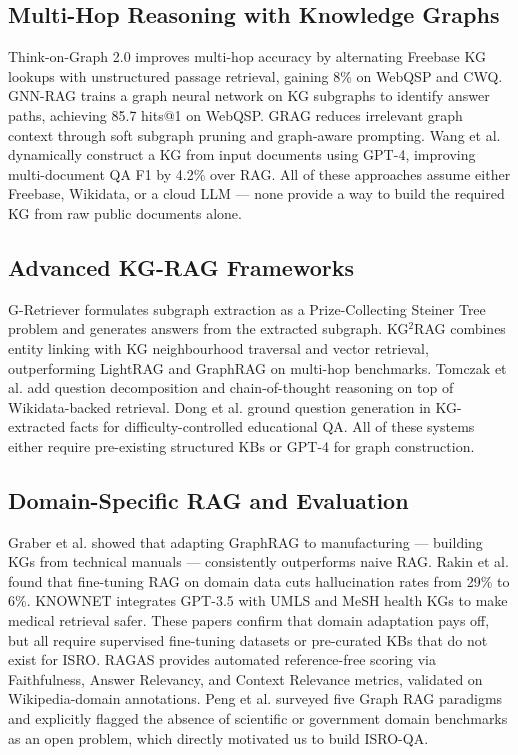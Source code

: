 \documentclass[conference]{IEEEtran}
\begin{document}
\subsection{Multi-Hop Reasoning with Knowledge Graphs}

Think-on-Graph 2.0 \cite{ma2024tog2} improves multi-hop accuracy by alternating Freebase KG lookups with unstructured passage retrieval, gaining 8\% on WebQSP and CWQ. GNN-RAG \cite{mavromatis2024gnnrag} trains a graph neural network on KG subgraphs to identify answer paths, achieving 85.7 hits@1 on WebQSP. GRAG \cite{hu2024grag} reduces irrelevant graph context through soft subgraph pruning and graph-aware prompting. Wang et al. \cite{wang2024kgprompting} dynamically construct a KG from input documents using GPT-4, improving multi-document QA F1 by 4.2\% over RAG. All of these approaches assume either Freebase, Wikidata, or a cloud LLM — none provide a way to build the required KG from raw public documents alone.

\subsection{Advanced KG-RAG Frameworks}

G-Retriever \cite{he2024gretriever} formulates subgraph extraction as a Prize-Collecting Steiner Tree problem and generates answers from the extracted subgraph. KG$^2$RAG \cite{zhang2025kg2rag} combines entity linking with KG neighbourhood traversal and vector retrieval, outperforming LightRAG and GraphRAG on multi-hop benchmarks. Tomczak et al. \cite{tomczak2025kgextended} add question decomposition and chain-of-thought reasoning on top of Wikidata-backed retrieval. Dong et al. \cite{dong2025kaqg} ground question generation in KG-extracted facts for difficulty-controlled educational QA. All of these systems either require pre-existing structured KBs or GPT-4 for graph construction.

\subsection{Domain-Specific RAG and Evaluation}

Graber et al. \cite{graber2025docgraphrag} showed that adapting GraphRAG to manufacturing — building KGs from technical manuals — consistently outperforms naive RAG. Rakin et al. \cite{rakin2024domainrag} found that fine-tuning RAG on domain data cuts hallucination rates from 29\% to 6\%. KNOWNET \cite{deng2024knownet} integrates GPT-3.5 with UMLS and MeSH health KGs to make medical retrieval safer. These papers confirm that domain adaptation pays off, but all require supervised fine-tuning datasets or pre-curated KBs that do not exist for ISRO. RAGAS \cite{es2023ragas} provides automated reference-free scoring via Faithfulness, Answer Relevancy, and Context Relevance metrics, validated on Wikipedia-domain annotations. Peng et al. \cite{peng2024graphragsurvey} surveyed five Graph RAG paradigms and explicitly flagged the absence of scientific or government domain benchmarks as an open problem, which directly motivated us to build ISRO-QA.
\end{document}
